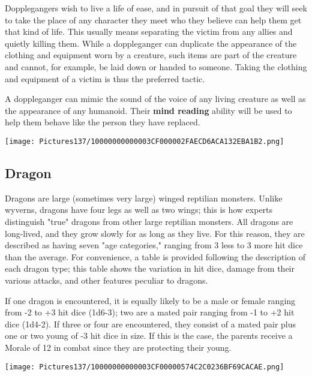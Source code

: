 \documentclass[a4paper,twoside,openany,10pt]{book}
\begin{document}
\begin{multicols}{2}
Dopplegangers wish to live a life of ease, and in pursuit of that goal they will seek to take the place of any character they meet who they believe can help them get that kind of life. This usually means separating the victim from any allies and quietly killing them. While a doppleganger can duplicate the appearance of the clothing and equipment worn by a creature, such items are part of the creature and cannot, for example, be laid down or handed to someone. Taking the clothing and equipment of a victim is thus the preferred tactic.

A doppleganger can mimic the sound of the voice of any living creature as well as the appearance of any humanoid. Their \textbf{mind reading} ability will be used to help them behave like the person they have replaced.


\begin{center}
	\texttt{[image: Pictures137/10000000000003CF000002FAECD6ACA132EBA1B2.png]}
\end{center}

\subsection*{Dragon}\label{dragon}

Dragons are large (sometimes very large) winged reptilian monsters. Unlike wyverns, dragons have four legs as well as two wings; this is how experts distinguish "true" dragons from other large reptilian monsters. All dragons are long-lived, and they grow slowly for as long as they live. For this reason, they are described as having seven "age categories," ranging from 3 less to 3 more hit dice than the average. For convenience, a table is provided following the description of each dragon type; this table shows the variation in hit dice, damage from their various attacks, and other features peculiar to dragons. 

If one dragon is encountered, it is equally likely to be a male or female ranging from -2 to +3 hit dice (1d6-3); two are a mated pair ranging from -1 to +2 hit dice (1d4-2). If three or four are encountered, they consist of a mated pair plus one or two young of -3 hit dice in size. If this is the case, the parents receive a Morale of 12 in combat since they are protecting their young.


\begin{center}
	\texttt{[image: Pictures137/10000000000003CF00000574C2C0236BF69CACAE.png]}
\end{center}


\end{multicols}
\end{document}
